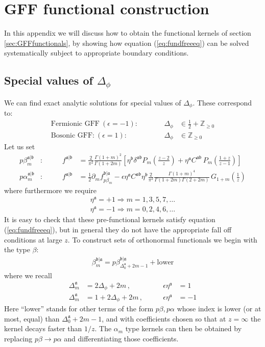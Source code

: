 \documentclass[12pt]{article}
\numberwithin{equation}{section}
\newcommand{\reef}[1]{(\ref{#1})}
\newcommand{\bea}{\begin{eqnarray}}
\newcommand{\eea}{\end{eqnarray}}
\newcommand{\ba}{\begin{equation}\begin{aligned}}
\newcommand{\ea}{\end{aligned}\end{equation}}
\newcommand{\Df}{{\Delta_\phi}}
\newcommand{\mf}[1]{\mathfrak #1}
\begin{document}
	
	\section{GFF functional construction}
	\label{app:gffkernels}
	In this appendix we will discuss how to obtain the functional kernels of section \ref{sec:GFFfunctionals}, by showing how equation \reef{eq:fundfreeeq} can be solved systematically subject to appropriate boundary conditions.
	
	
	\subsection{Special values of $\Df$}\label{app:splval}
	We can find exact analytic solutions for special values of $\Df$. These correspond to:
	\ba
	\mbox{Fermionic GFF}\ (\epsilon=-1):&\qquad& \Df&\in \frac 12+\mathbb Z_{\geq 0}\\
	\mbox{Bosonic GFF:}\ (\epsilon=1):&\qquad& \Df&\in\mathbb Z_{\geq 0}
	\ea
	Let us set
	\ba
	p\beta^{\mf a|\mf b}_m&: \qquad& f^{\mf a|\mf b}&=\frac{2}{\pi^2} \frac{\Gamma(1+m)^2}{\Gamma(1+2m)}\left[\eta^{\mf b} \delta^{\mf a \mf b} P_{m}(\mbox{$\frac{z-2}z$})+\eta^{\mf a} C^{\mf a \mf b}\,P_{m}(\mbox{$\frac{1+z}{z-1}$}) \right]\\
	p\alpha^{\mf a|\mf b}_m&: \qquad&  f^{\mf a|\mf b}&=\frac 12 \partial_m f^{\mf b|\mf a}_{p\beta_m}-\epsilon \eta^{\mf a} C^{\mf a \mf b} \eta^{\mf b} \frac{2}{\pi^2} \frac{\Gamma(1+m)^4}{\Gamma(1+2m)\Gamma(2+2m)}\, G_{1+m}(\mbox{$\frac{1}{z}$})
	\ea
	where furthermore we require
	\bea
	\eta^{\mf a}=+1 \Rightarrow m=1,3,5,7,\ldots\\
	\eta^{\mf a}=-1 \Rightarrow m=0,2,4,6,\ldots
	\eea
	It is easy to check that these pre-functional kernels satisfy equation \reef{eq:fundfreeeq}, but in general they do not have the appropriate fall off conditions at large $z$. To construct sets of orthonormal functionals we begin with the type $\beta$:
	\bea
	\beta_m^{\mf b|\mf a}=p\beta^{\mf b|\mf a}_{\Delta^{\mf a}_0+2m-1}+\mbox{lower}
	\eea
	where we recall
	\ba
	\Delta^{\mf a}_m&=2\Df+2m\,,& \qquad \epsilon \eta^{\mf a}&=1\\
	\Delta^{\mf a}_m&=1+2\Df+2m\,,& \qquad \epsilon \eta^{\mf a}&=-1
	\ea
	Here ``lower'' stands for other terms of the form $p\beta, p\alpha$ whose index is lower (or at most, equal) than $\Delta^{\mf a}_0+2m-1$, and with coefficients chosen so that at $z=\infty$ the kernel decays faster than $1/z$. The $\alpha_m$ type kernels can then be obtained by replacing $p\beta \to p\alpha$ and differentiating those coefficients. 
	
\end{document}
